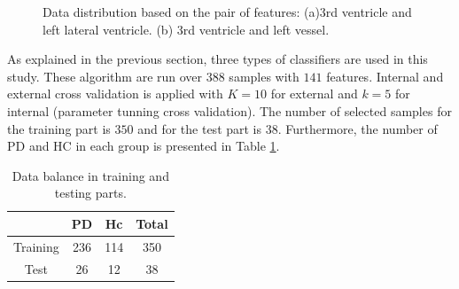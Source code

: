 \documentclass[runningheads,a4paper]{llncs}
\begin{document}
\begin{figure}[!tbp]
  \centering
  \hfill
  \caption{Data distribution based on the pair of features: (a)3rd ventricle and left lateral ventricle. (b) 3rd ventricle and left vessel.}
  \label{fig:pairfeat}
\end{figure}
As explained in the previous section, three types of classifiers are used in this study. These algorithm are run over $388$ samples with $141$ features. Internal and external cross validation is applied with $K=10$ for external and $k=5$ for internal (parameter tunning cross validation). The number of selected samples for the training part is $350$ and for the test part is $38$. Furthermore, the number of PD and HC in each group is presented in Table \ref{tab:trtedata}.
\begin{table}[h]\small
\centering
\caption{Data balance in training and testing parts.}\setlength{\abovecaptionskip}{0pt}
\begin{tabular}{|c|c|c|c|}
\hline
         & PD  & Hc  & Total \\ \hline
Training & 236 & 114 & 350   \\ \hline
Test     & 26  & 12  & 38    \\ \hline
\end{tabular}
\label{tab:trtedata}
\end{table}
\end{document}
